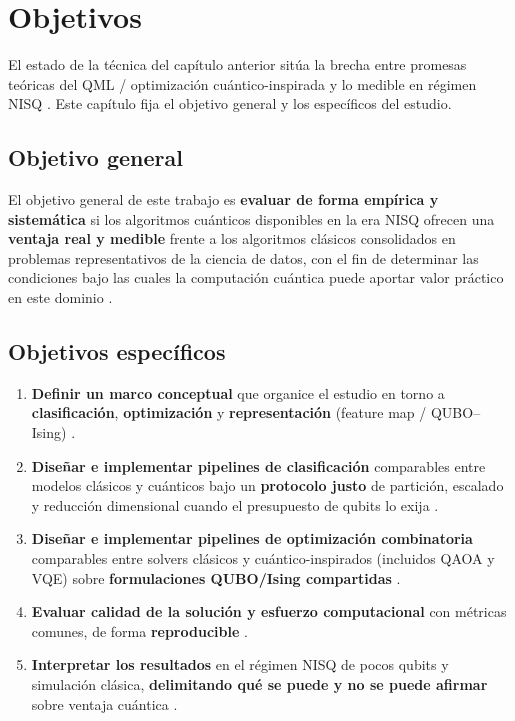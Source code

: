 \chapter{Objetivos}\label{cap:objetivos}

El estado de la técnica del capítulo anterior sitúa la brecha entre promesas teóricas del QML / optimización cuántico-inspirada y lo medible en régimen NISQ \citep{preskill2018, bowles2024}. Este capítulo fija el objetivo general y los específicos del estudio.

\section{Objetivo general}

El objetivo general de este trabajo es \textbf{evaluar de forma empírica y sistemática} si los algoritmos cuánticos disponibles en la era NISQ ofrecen una \textbf{ventaja real y medible} frente a los algoritmos clásicos consolidados en problemas representativos de la ciencia de datos, con el fin de determinar las condiciones bajo las cuales la computación cuántica puede aportar valor práctico en este dominio \citep{preskill2018, biamonte2017}.

\section{Objetivos específicos}

\begin{enumerate}
    \item \textbf{Definir un marco conceptual} que organice el estudio en torno a \textbf{clasificación}, \textbf{optimización} y \textbf{representación} (feature map / QUBO--Ising) \citep{lloyd2020, pennylaneEmbedBlog, parzygnat2025}.

    \item \textbf{Diseñar e implementar pipelines de clasificación} comparables entre modelos clásicos y cuánticos bajo un \textbf{protocolo justo} de partición, escalado y reducción dimensional cuando el presupuesto de qubits lo exija \citep{schuld2021, havlicek2019, bowles2024}.

    \item \textbf{Diseñar e implementar pipelines de optimización combinatoria} comparables entre solvers clásicos y cuántico-inspirados (incluidos QAOA y VQE) sobre \textbf{formulaciones QUBO/Ising compartidas} \citep{farhi2014, peruzzo2014, lucas2014, lubinski2024}.

    \item \textbf{Evaluar calidad de la solución y esfuerzo computacional} con métricas comunes, de forma \textbf{reproducible} \citep{bowles2024, cerezo2021}.

    \item \textbf{Interpretar los resultados} en el régimen NISQ de pocos qubits y simulación clásica, \textbf{delimitando qué se puede y no se puede afirmar} sobre ventaja cuántica \citep{huang2021, thanasilp2022, mcclean2018, preskill2018}.
\end{enumerate}
